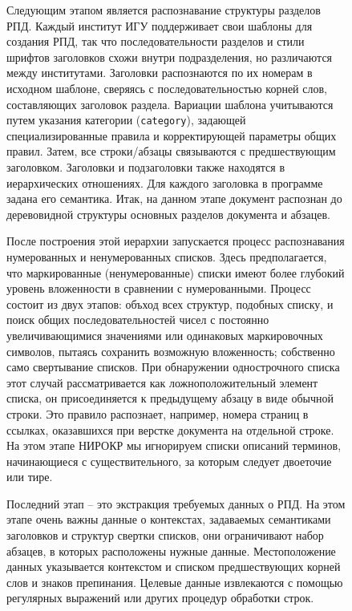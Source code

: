 \documentclass[ 

]{aiitart}
\begin{document}
\begin{figure}
Следующим этапом является распознавание структуры разделов РПД. Каждый институт ИГУ поддерживает свои шаблоны для создания РПД, так что последовательности разделов и стили шрифтов заголовков схожи внутри подразделения, но различаются между институтами. Заголовки распознаются по их номерам в исходном шаблоне, сверяясь с последовательностью корней слов, составляющих заголовок раздела. Вариации шаблона учитываются путем указания категории (\verb|category|), задающей специализированные правила и корректирующей параметры общих правил. Затем, все строки/абзацы связываются с предшествующим заголовком. Заголовки и подзаголовки также находятся в иерархических отношениях.  Для каждого заголовка в программе задана его семантика. Итак, на данном этапе документ распознан до деревовидной структуры основных разделов документа и абзацев. 

После построения этой иерархии запускается процесс распознавания нумерованных и ненумерованных списков. Здесь предполагается, что маркированные (ненумерованные) списки имеют более глубокий уровень вложенности в сравнении с нумерованными. Процесс состоит из двух этапов: объход всех структур, подобных списку, и поиск общих последовательностей чисел с постоянно увеличивающимися значениями или одинаковых маркировочных символов, пытаясь сохранить возможную вложенность; собственно само свертывание списков. При обнаружении однострочного списка этот случай рассматривается как ложноположительный элемент списка, он присоединяется к предыдущему абзацу в виде обычной строки. Это правило распознает, например, номера страниц в ссылках, оказавшихся при верстке документа на отдельной строке. На этом этапе НИРОКР мы игнорируем списки описаний терминов, начинающиеся с существительного, за которым следует двоеточие или тире.

Последний этап -- это экстракция требуемых данных о РПД. На этом этапе очень важны данные о контекстах, задаваемых семантиками заголовков и структур свертки списков, они ограничивают набор абзацев, в которых расположены нужные данные. Местоположение данных указывается контекстом и списком предшествующих корней слов и знаков препинания. Целевые данные извлекаются с помощью регулярных выражений или других процедур обработки строк. 


\end{figure}
\end{document}
